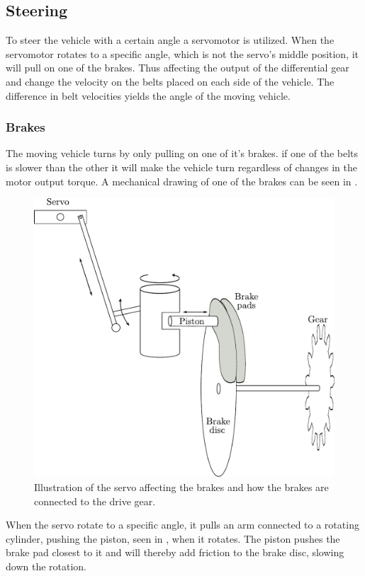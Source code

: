 \subsection{Steering}
To steer the vehicle with a certain angle a servomotor is utilized. When the servomotor rotates to a specific angle, which is not the servo's middle position, it will pull on one of the brakes. Thus affecting the output of the differential gear and change the velocity on the belts placed on each side of the vehicle. The difference in belt velocities yields the angle of the moving vehicle.

\subsubsection{Brakes}
The moving vehicle turns by only pulling on one of it's brakes. if one of the belts is slower than the other it will make the vehicle turn regardless of changes in the motor output torque. A mechanical drawing of one of the brakes can be seen in . 

 \begin{figure}[H]
	\centering
	\includegraphics[scale=0.6]{figures/brakeDescription.pdf}
	\caption{Illustration of the servo affecting the brakes and how the brakes are connected to the drive gear.}
	\label{Brakes}
\end{figure}

When the servo rotate to a specific angle, it pulls an arm connected to a rotating cylinder, pushing the piston, seen in , when it rotates. The piston pushes the brake pad closest to it and will thereby add friction to the brake disc, slowing down the rotation.

